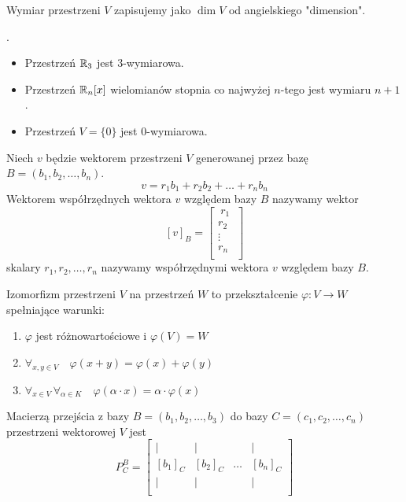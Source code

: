 \documentclass[a4paper,12pt]{article}
\begin{document}
\begin{notation}
	Wymiar przestrzeni $V$ zapisujemy jako $\dim V$ od angielskiego "dimension".
\end{notation}

\begin{example}
	.
	\begin{itemize}
		\item Przestrzeń $\mathbb{R}_3$ jest $3$-wymiarowa. 
		\item Przestrzeń $\mathbb{R}_n[x]$ wielomianów stopnia co najwyżej $n$-tego jest wymiaru $n+1$. 
		\item Przestrzeń $V = \{ 0 \}$ jest $0$-wymiarowa.
	\end{itemize}
\end{example}

\newpage

\begin{definition}
	Niech $v$ będzie wektorem przestrzeni $V$ generowanej przez bazę $B = (b_1,b_2,\dots,b_n)$.
	\[
		v = r_1 b_1 + r_2 b_2 + \dots + r_n b_n
	\]
	Wektorem współrzędnych wektora $v$ względem bazy $B$ nazywamy wektor
	\[
		[v]_B = 
		\begin{bmatrix}
			 \ r_1\  \\
			 r_2 \\
			 \vdots \\
			 r_n \\
		\end{bmatrix}
	\]
	skalary $r_1, r_2, \dots, r_n$ nazywamy współrzędnymi wektora $v$ względem bazy $B$.  
\end{definition}

\begin{definition}
	Izomorfizm przestrzeni $V$ na przestrzeń $W$ to przekształcenie $\varphi\colon V \to W$ spełniające warunki:
	\begin{enumerate}
		\item $\varphi$ jest różnowartościowe i $\varphi(V) = W$
		\item $\forall_{x,y \in V}\quad \varphi(x+y) = \varphi(x) + \varphi(y)$
		\item $\forall_{x \in V}\, \forall_{\alpha \in K}\quad \varphi(\alpha \cdot x) = \alpha \cdot \varphi (x)$    
	\end{enumerate} 
\end{definition}

\begin{definition}
	Macierzą przejścia z bazy $B = (b_1,b_2,\dots,b_3)$ do bazy $C = (c_1,c_2,\dots,c_n)$ przestrzeni wektorowej $V$ jest
	\[
		P^B_C = 
		\begin{bmatrix}
			| & | &  & |  \\
			[b_1]_C & [b_2]_C & \dots & [b_n]_C  \\
			| & | &  & |  \\
		\end{bmatrix}
	\] 
\end{definition}
\end{document}
